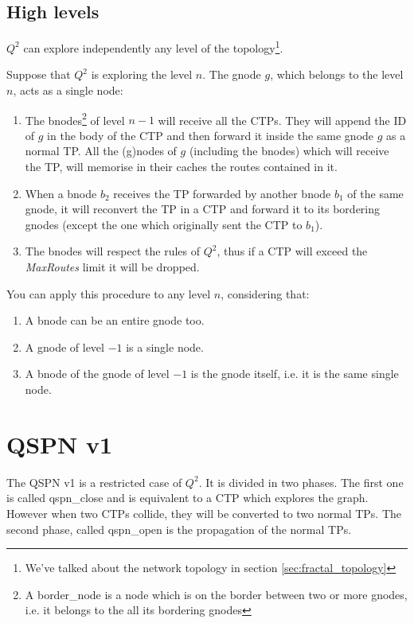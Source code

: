 \documentclass[a4paper]{article}
\begin{document}
\subsection{High levels}
$Q^2$ can explore independently any level of the topology\footnote{We've
talked about the network topology in section \ref{sec:fractal_topology}}.

Suppose that $Q^2$ is exploring the level $n$. The gnode $g$, which belongs
to the level $n$, acts as a single node:
\begin{enumerate}
	\item The bnodes\footnote{A border\_node is a node which is on the
		border between two or more gnodes, i.e. it belongs to the all
		its bordering gnodes} of level $n-1$ will receive all the CTPs.
		They will append the ID of $g$ in the body of the CTP and then
		forward it inside the same gnode $g$ as a normal TP.
		All the (g)nodes of $g$ (including the bnodes) which will
		receive the TP, will memorise in their caches the routes
		contained in it.
	\item When a bnode $b_2$ receives the TP forwarded by another bnode
		$b_1$ of the same gnode, it will reconvert the TP in a CTP and
		forward it to its bordering gnodes (except the one which
		originally sent the CTP to $b_1$).
	\item The bnodes will respect the rules of $Q^2$, thus if a CTP will
		exceed the \emph{MaxRoutes} limit it will be dropped. 
\end{enumerate}
You can apply this procedure to any level $n$, considering that:
\begin{enumerate}
	\item A bnode can be an entire gnode too.
	\item A gnode of level $-1$ is a single node.
	\item A bnode of the gnode of level $-1$ is the gnode itself, i.e. it
		is the same single node.
\end{enumerate}

\section{QSPN v1}
\label{sec:QSPNv1}
The QSPN v1 is a restricted case of $Q^2$.
It is divided in two phases. The first one is called qspn\_close and is equivalent
to a CTP which explores the graph. However when two CTPs collide, they will be
converted to two normal TPs. The second phase, called qspn\_open is the
propagation of the normal TPs.
\end{document}
